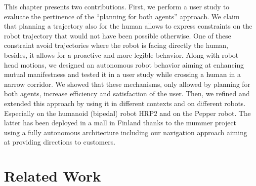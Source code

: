 \documentclass[a4paper,11pt,twoside]{StyleThese}
\begin{document}
This chapter presents two contributions. First, we perform a user study to evaluate the pertinence of the ``planning for both agents'' approach. We claim that planning a trajectory also for the human allows to express constraints on the robot trajectory that would not have been possible otherwise. One of these constraint avoid trajectories where the robot is facing directly the human, besides, it allows for a proactive and more legible behavior. Along with robot head motions, we designed an autonomous robot behavior aiming at enhancing mutual manifestness and tested it in a user study while crossing a human in a narrow corridor. We showed that these mechanisms, only allowed by planning for both agents, increase efficiency and satisfaction of the user.
Then, we refined and extended this approach by using it in different contexts and on different robots. Especially on the humanoid (bipedal) robot HRP2 and on the Pepper robot. The latter has been deployed in a mall in Finland thanks to the \acrshort{mummer} project using a fully autonomous architecture including our navigation approach aiming at providing directions to customers.

\section{Related Work}
\end{document}
